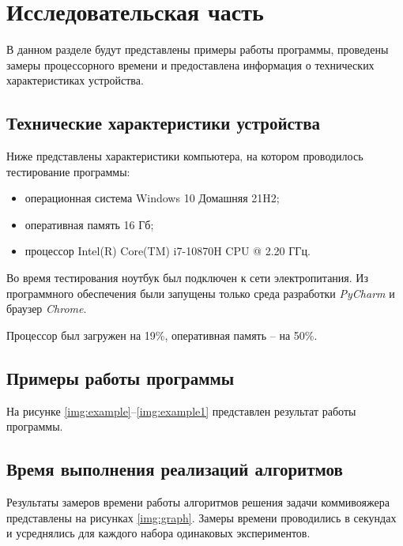 \chapter{Исследовательская часть}

В данном разделе будут представлены примеры работы программы, проведены замеры процессорного времени и предоставлена информация о технических характеристиках устройства.

\section{Технические характеристики устройства}

Ниже представлены характеристики компьютера, на котором проводилось тестирование программы:
\begin{itemize}[label=---]
    \item операционная система Windows 10 Домашняя 21H2;
    \item оперативная память 16 Гб;
    \item процессор Intel(R) Core(TM) i7-10870H CPU @ 2.20 ГГц.
\end{itemize}

Во время тестирования ноутбук был подключен к сети электропитания. Из программного обеспечения были запущены только среда разработки \textit{PyCharm} и браузер \textit{Chrome}.

Процессор был загружен на 19\%, оперативная память -- на 50\%.

\section{Примеры работы программы}

На рисунке \ref{img:example}--\ref{img:example1} представлен результат работы программы.

\clearpage


\section{Время выполнения реализаций алгоритмов}

Результаты замеров времени работы алгоритмов решения задачи коммивояжера представлены на рисунках \ref{img:graph}. Замеры времени проводились в секундах и усреднялись для каждого набора одинаковых экспериментов.


